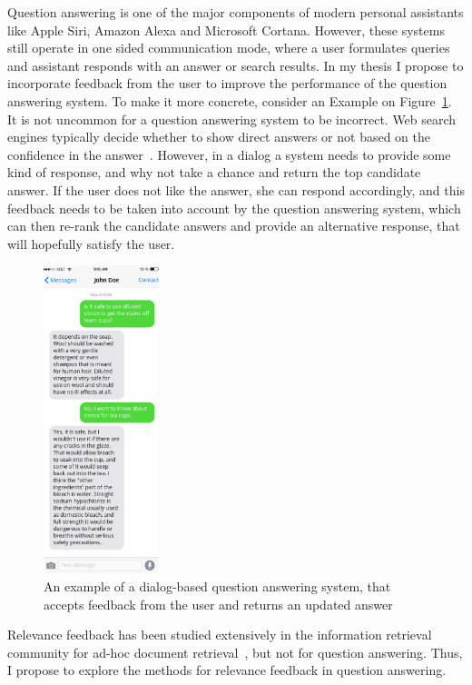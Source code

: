 Question answering is one of the major components of modern personal assistants like Apple Siri, Amazon Alexa and Microsoft Cortana.
However, these systems still operate in one sided communication mode, where a user formulates queries and assistant responds with an answer or search results.
In my thesis I propose to incorporate feedback from the user to improve the performance of the question answering system.
To make it more concrete, consider an Example on Figure~\ref{figure:users:proposal:example}.
It is not uncommon for a question answering system to be incorrect.
Web search engines typically decide whether to show direct answers or not based on the confidence in the answer~\cite{yang2015wikiqa}.
However, in a dialog a system needs to provide some kind of response, and why not take a chance and return the top candidate answer.
If the user does not like the answer, she can respond accordingly, and this feedback needs to be taken into account by the question answering system, which can then re-rank the candidate answers and provide an alternative response, that will hopefully satisfy the user.

\begin{figure}
\centering
\includegraphics[width=0.3\textwidth]{img/chatbot_example}
\caption{An example of a dialog-based question answering system, that accepts feedback from the user and returns an updated answer}
\label{figure:users:proposal:example}
\end{figure}

Relevance feedback has been studied extensively in the information retrieval community for ad-hoc document retrieval~\cite{salton1997improving,rocchio1971relevance,wang2008study}, but not for question answering.
Thus, I propose to explore the methods for relevance feedback in question answering.

